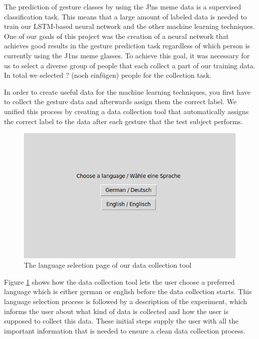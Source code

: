 \documentclass[runningheads]{llncs}
\begin{document}
The prediction of gesture classes by using the J!ns meme data is a supervised classification task. This means that a large amount of labeled data is needed to train our LSTM-based neural network and the other machine learning techniques. One of our goals of this project was the creation of a neural network that achieves good results in the gesture prediction task regardless of which person is currently using the J1ns meme glasses. To achieve this goal, it was necessary for us to select a diverse group of people that each collect a part of our training data. In total we selected ? (noch einfügen) people for the collection task.
\par
In order to create useful data for the machine learning techniques, you first have to collect the gesture data and afterwards assign them the correct label. We unified this process by creating a data collection tool that automatically assigns the correct label to the data after each gesture that the test subject performs.
\begin{center}
\begin{figure}
\centerline{\includegraphics[scale=0.5]{Language_Selection.png}}
\caption{The language selection page of our data collection tool}
\label{fig:gesturestart}
\end{figure}
\end{center}
Figure \ref{fig:gesturestart} shows how the data collection tool lets the user choose a preferred language which is either german or english before the data collection starts. This language selection process is followed by a description of the experiment, which informs the user about what kind of data is collected and how the user is supposed to collect this data. These initial steps supply the user with all the important information that is needed to ensure a clean data collection process.
\end{document}
